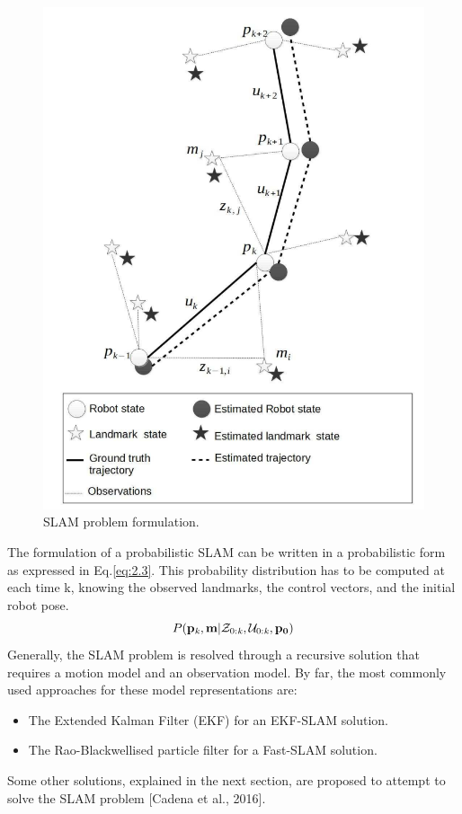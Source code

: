 \documentclass[11pt,openany]{book}
\begin{document}
\begin{figure}[H]
    \centering
    \includegraphics[width=\linewidth]{assets/2_4.png}
    \caption{SLAM problem formulation.}
    \label{fig:2.4}
\end{figure}
The formulation of a probabilistic SLAM can be written in a probabilistic form as expressed in Eq.\ref{eq:2.3}. This probability distribution has to be computed at each time k, knowing the observed landmarks, the control vectors, and the initial robot pose.
\begin{equation} \label{eq:2.3}
    P(\mathbf{p_\mathit{k}},\mathbf{m} \vert \mathcal{Z_\text{0:\textit{k}}},\mathcal{U_\text{0:\textit{k}}},\mathbf{p_0})
\end{equation}
Generally, the SLAM problem is resolved through a recursive solution that requires a motion model and an observation model. By far, the most commonly used approaches for these model representations are:
\begin{itemize}
    \item The Extended Kalman Filter (EKF) for an EKF-SLAM solution.
    \item The Rao-Blackwellised particle ﬁlter for a Fast-SLAM solution.
\end{itemize}
Some other solutions, explained in the next section, are proposed to attempt to solve the SLAM problem [Cadena et al., 2016].
\end{document}
